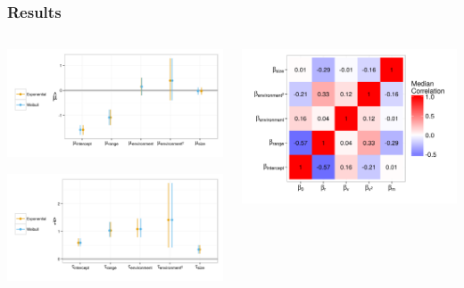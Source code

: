 \documentclass{beamer}
\begin{document}
\begin{frame}
  \frametitle{Results}
 
  \begin{columns}
    \begin{column}{0.5\textwidth}
      \includegraphics[width=\textwidth,keepaspectratio=true]{figure/coef_means}

      \includegraphics[width=\textwidth,keepaspectratio=true]{figure/coef_var}
    \end{column}
    \begin{column}{0.5\textwidth}
      \includegraphics[width=\textwidth,keepaspectratio=true]{figure/wei_cor_heatmap}
    \end{column}
  \end{columns}
  
  \tiny{}
\end{frame}
\end{document}
